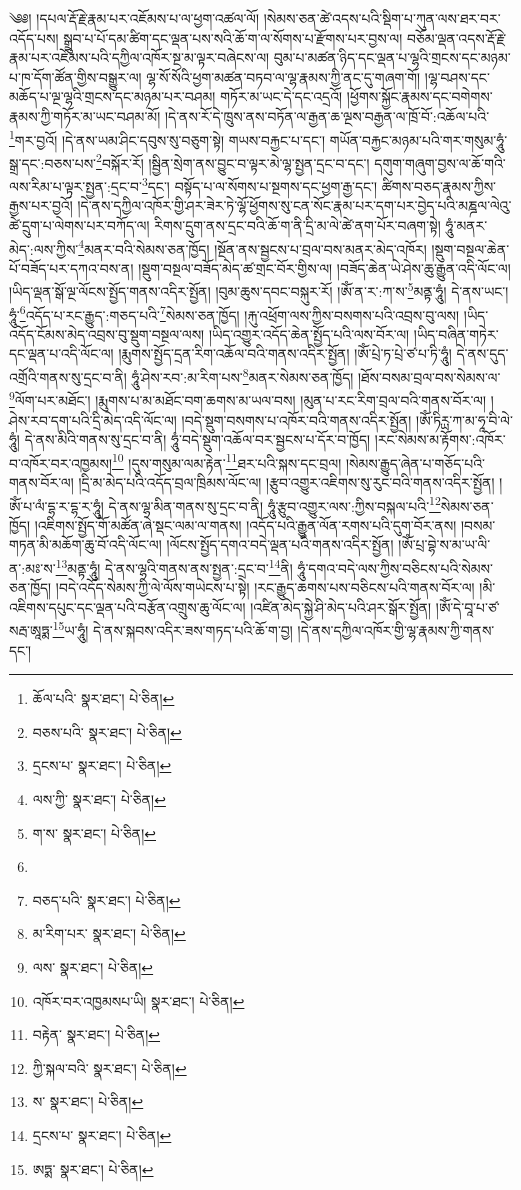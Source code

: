 \setcounter{footnote}{0} 
༄༅། །དཔལ་རྡོ་རྗེ་རྣམ་པར་འཇོམས་པ་ལ་ཕྱག་འཚལ་ལོ། །སེམས་ཅན་ཚེ་འདས་པའི་སྡིག་པ་ཀུན་ལས་ཐར་བར་འདོད་པས། སྒྲུབ་པ་པོ་དམ་ཚིག་དང་ལྡན་པས་སའི་ཆོ་ག་ལ་སོགས་པ་རྫོགས་པར་བྱས་ལ། བཅོམ་ལྡན་འདས་རྡོ་རྗེ་རྣམ་པར་འཇོམས་པའི་དཀྱིལ་འཁོར་སྔ་མ་ལྟར་བཞེངས་ལ། བུམ་པ་མཚན་ཉིད་དང་ལྡན་པ་ལྷའི་གྲངས་དང་མཉམ་པ་ཁ་དོག་ཚོན་གྱིས་བསྒྱུར་ལ། ལྷ་སོ་སོའི་ཕྱག་མཚན་བཏབ་ལ་ལྷ་རྣམས་ཀྱི་ནང་དུ་གཞག་གོ། །ལྷ་བཤས་དང་མཆོད་པ་ལྔ་ལྷའི་གྲངས་དང་མཉམ་པར་བཤམ། གཏོར་མ་ཡང་དེ་དང་འདྲའོ། །ཕྱོགས་སྐྱོང་རྣམས་དང་བགེགས་རྣམས་ཀྱི་གཏོར་མ་ཡང་བཤམ་མོ། །དེ་ནས་རོ་དེ་ཁྲུས་ནས་བཏོན་ལ་རྒྱན་ཆ་ལྔས་བརྒྱན་ལ་ཁྲོ་བོ་:འཆོལ་པའི་\footnote{ཆོལ་པའི་  སྣར་ཐང་།  པེ་ཅིན། }གར་བྱའོ། །དེ་ནས་ཡམ་ཤིང་དབུས་སུ་བཅུག་སྟེ། གཡས་བརྐྱང་པ་དང་། གཡོན་བརྐྱང་མཉམ་པའི་གར་གསུམ་ཧཱུཾ་སྒྲ་དང་:བཅས་པས་\footnote{བཅས་པའི་  སྣར་ཐང་།  པེ་ཅིན། }བསྐོར་རོ། །སྦྱིན་སྲེག་ནས་བྱུང་བ་ལྟར་མེ་ལྷ་སྤྱན་དྲང་བ་དང་། དགུག་གཞུག་བྱས་ལ་ཆོ་གའི་ལས་རིམ་པ་ལྟར་སྤྱན་:དྲང་བ་\footnote{དྲངས་པ་  སྣར་ཐང་།  པེ་ཅིན། }དང་། བསྟོད་པ་ལ་སོགས་པ་སྔགས་དང་ཕྱག་རྒྱ་དང་། ཚིགས་བཅད་རྣམས་ཀྱིས་རྒྱས་པར་བྱའོ། །དེ་ནས་དཀྱིལ་འཁོར་གྱི་ཤར་ཟེར་ཏེ་ལྷོ་ཕྱོགས་སུ་ངན་སོང་རྣམ་པར་དག་པར་བྱེད་པའི་མཎྜལ་ལེའུ་ཚེ་དྲུག་པ་ལེགས་པར་བཀོད་ལ། རིགས་དྲུག་ནས་དྲང་བའི་ཆོ་ག་ནི་དྲི་མ་ལེ་ཚེ་ནག་པོར་བཞག་སྟེ། ཧཱུཾ་མནར་མེད་:ལས་ཀྱིས་\footnote{ལས་ཀྱི་  སྣར་ཐང་།  པེ་ཅིན། }མནར་བའི་སེམས་ཅན་ཁྱོད། །སྔོན་ནས་སྦྱངས་པ་བྲལ་བས་མནར་མེད་འཁོར། །སྡུག་བསྔལ་ཆེན་པོ་བཟོད་པར་དཀའ་བས་ན། །སྡུག་བསྔལ་བཟོད་མེད་ཚ་གྲང་བོར་གྱིས་ལ། །བཟོད་ཆེན་ཡེ་ཤེས་ཆུ་རྒྱུན་འདི་ལོང་ལ། །ཡིད་ལྡན་སྒོ་ལྔ་ལོངས་སྤྱོད་གནས་འདིར་སྤྱོན། །བུམ་ཆུས་དབང་བསྐུར་རོ། །ཨོཾ་ན་ར་:ཀ་ས་\footnote{ག་ས་  སྣར་ཐང་།  པེ་ཅིན། }མནྟ་ཧཱུཾ། དེ་ནས་ཡང་། ཧཱུཾ་\footnote{}འདོད་པ་རང་རྒྱུད་:གཅད་པའི་\footnote{བཅད་པའི་  སྣར་ཐང་།  པེ་ཅིན། }སེམས་ཅན་ཁྱོད། །རྐུ་འཕྲོག་ལས་ཀྱིས་བསགས་པའི་འབྲས་བུ་ལས། །ཡིད་འདོད་ངོམས་མེད་འབྲས་བུ་སྡུག་བསྔལ་ལས། །ཡིད་འགྱུར་འདོད་ཆེན་སྤྱོད་པའི་ལས་བོར་ལ། །ཡིད་བཞིན་གཏེར་དང་ལྡན་པ་འདི་ལོང་ལ། །རྨུགས་སྤྱོད་དྲན་རིག་འཆོལ་བའི་གནས་འདིར་སྤྱོན། །ཨོཾ་པྲེ་ཏ་པྲེ་ཙ་པ་ཏི་ཧཱུཾ། དེ་ནས་དུད་འགྲོའི་གནས་སུ་དྲང་བ་ནི། ཧཱུཾ་ཤེས་རབ་:མ་རིག་པས་\footnote{མ་རིག་པར་  སྣར་ཐང་།  པེ་ཅིན། }མནར་སེམས་ཅན་ཁྱོད། །ཐོས་བསམ་བྲལ་བས་སེམས་ལ་\footnote{ལས་  སྣར་ཐང་།  པེ་ཅིན། }ལོག་པར་མཐོང་། །རྨུགས་པ་མ་མཐོང་བག་ཆགས་མ་ཡལ་བས། །མུན་པ་རང་རིག་བྲལ་བའི་གནས་བོར་ལ། །ཤེས་རབ་དག་པའི་དྲི་མེད་འདི་ལོང་ལ། །བདེ་སྡུག་བསགས་པ་འཁོར་བའི་གནས་འདིར་སྤྱོན། །ཨོཾ་ཏིཪྻ་ཀ་མ་ཧཱ་བི་ལེ་ཧཱུཾ། དེ་ནས་མིའི་གནས་སུ་དྲང་བ་ནི། ཧཱུཾ་བདེ་སྡུག་འཆོལ་བར་སྦྱངས་པ་དོར་བ་ཁྱོད། །རང་སེམས་མ་རྟོགས་:འཁོར་བ་འཁོར་བར་འཁྱམས།\footnote{འཁོར་བར་འཁྱམསཔ་ཡི།  སྣར་ཐང་།  པེ་ཅིན། } །དུས་གསུམ་ལམ་རྟེན་\footnote{བརྟེན་  སྣར་ཐང་།  པེ་ཅིན། }ཐར་པའི་སྐས་དང་བྲལ། །སེམས་རྒྱུད་ཞེན་པ་གཅོད་པའི་གནས་བོར་ལ། །དྲི་མ་མེད་པའི་འདོད་བྲལ་ཁྲིམས་ལོང་ལ། །རྩུབ་འགྱུར་འཇིགས་སུ་རུང་བའི་གནས་འདིར་སྤྱོན། །ཨོཾ་པ་ལཾ་དྷ་ར་དྷ་ར་ཧཱུཾ། དེ་ནས་ལྷ་མིན་གནས་སུ་དྲང་བ་ནི། ཧཱུཾ་རྩུབ་འགྱུར་ལས་:ཀྱིས་བསྐལ་པའི་\footnote{ཀྱི་སྐལ་བའི་  སྣར་ཐང་།  པེ་ཅིན། }སེམས་ཅན་ཁྱོད། །འཇིགས་སྤྱོད་གོ་མཚོན་ཞེ་སྡང་ལམ་ལ་གནས། །འདོད་པའི་རྒྱུན་ལོན་རགས་པའི་དུག་བོར་ནས། །བསམ་གཏན་མི་མཆོག་ཆུ་བོ་འདི་ལོང་ལ། །ལོངས་སྤྱོད་དགའ་བདེ་ལྡན་པའི་གནས་འདིར་སྤྱོན། །ཨོཾ་པྲ་བྷེ་ས་མ་ཡ་ལི་ན་:མཿ་ས་\footnote{ས་  སྣར་ཐང་།  པེ་ཅིན། }མནྟ་ཧཱུཾ། དེ་ནས་ལྷའི་གནས་ནས་སྤྱན་:དྲང་བ་\footnote{དྲངས་པ་  སྣར་ཐང་།  པེ་ཅིན། }ནི། ཧཱུཾ་དགའ་བདེ་ལས་ཀྱིས་བཅིངས་པའི་སེམས་ཅན་ཁྱོད། །བདེ་འདོད་སེམས་ཀྱི་ལེ་ལོས་གཡེངས་པ་སྟེ། །རང་རྒྱུད་ཆགས་པས་བཅིངས་པའི་གནས་བོར་ལ། །མི་འཇིགས་དཔུང་དང་ལྡན་པའི་བརྩོན་འགྲུས་ཆུ་ལོང་ལ། །འཛིན་མེད་སྐྱེ་ཤི་མེད་པའི་ཤར་སྒོར་སྤྱོན། །ཨོཾ་དེ་བཱ་པ་ཙ་སརྦ་ཨཱཏྨ་\footnote{ཨཏྨ་  སྣར་ཐང་།  པེ་ཅིན། }ཡ་ཧཱུཾ། དེ་ནས་སྐབས་འདིར་ཟས་གཏད་པའི་ཆོ་ག་བྱ། །དེ་ནས་དཀྱིལ་འཁོར་གྱི་ལྷ་རྣམས་ཀྱི་གནས་དང་། 